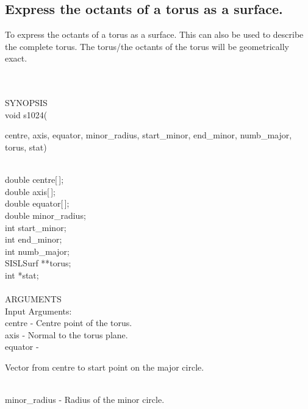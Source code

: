 \subsection{Express the octants of a torus as a surface.}
\begin{minipg1}
  To express the octants of a torus as a surface. This can also be used
  to describe the complete torus.
  The torus/the octants of the torus will be geometrically exact.
\end{minipg1}\\ \\
SYNOPSIS\\
        \>void s1024(\begin{minipg3}
          {\fov centre}, {\fov axis}, {\fov equator}, {\fov minor\_radius}, {\fov start\_minor}, {\fov end\_minor},
          {\fov numb\_major}, {\fov torus}, {\fov stat})
        \end{minipg3}\\[0.3ex]
        \>\>    double \> {\fov centre}[\,];\\
        \>\>    double \> {\fov axis}[\,];\\
        \>\>    double \> {\fov equator}[\,];\\
        \>\>    double \> {\fov minor\_radius};\\
        \>\>    int    \> {\fov start\_minor};\\
        \>\>    int    \> {\fov end\_minor};\\
        \>\>    int    \> {\fov numb\_major};\\
        \>\>    SISLSurf \> **{\fov torus};\\
        \>\>    int    \> *{\fov stat};\\
\\
ARGUMENTS\\
        \>Input Arguments:\\
        \>\>    {\fov centre} \> - \> Centre point of the torus.\\
        \>\>    {\fov axis}   \> - \> Normal to the torus plane.\\
        \>\>    {\fov equator}\> - \> \begin{minipg2}
                                        Vector from centre to start point
                                        on the major circle.
                                      \end{minipg2}\\[0.8ex]
        \>\>    {\fov minor\_radius} \> - \> Radius of the minor circle.\\
